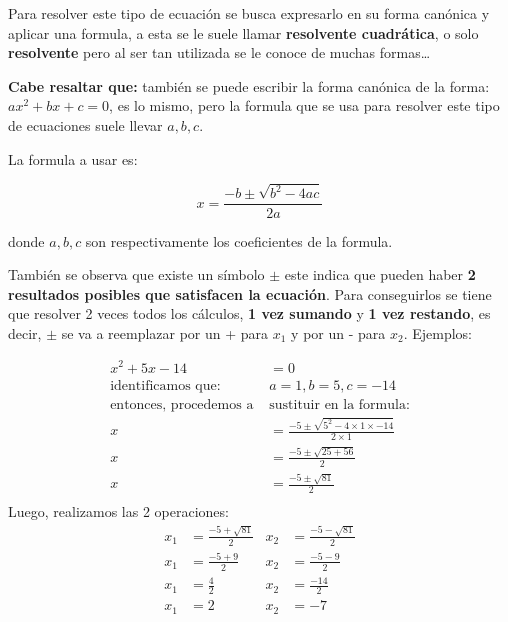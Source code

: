     Para resolver este tipo de ecuación se busca expresarlo en su forma canónica
    y aplicar una formula, a esta se le suele llamar \textbf{resolvente cuadrática},
    o solo \textbf{resolvente} pero al ser tan utilizada se le conoce de muchas
    formas\dots

    \textbf{Cabe resaltar que:}
    también se puede escribir la forma canónica de la forma:
    $ax^2+bx+c=0$, es lo mismo, pero la formula que se usa para resolver este tipo
    de ecuaciones suele llevar $a,b,c$.

    La formula a usar es:

    $$x = \frac{-b \pm \sqrt{b^2 - 4ac}}{2a} $$


    donde $a,b,c$ son respectivamente los coeficientes de la formula.

    También se observa que existe un símbolo $\pm$ este indica que pueden haber
    \textbf{2 resultados posibles que satisfacen la ecuación}. Para conseguirlos
    se tiene que resolver 2 veces todos los cálculos, \textbf{1 vez sumando} y
    \textbf{1 vez restando}, es decir, $\pm$ se va a reemplazar por un + para
    $x_1$ y por un - para $x_2$.    Ejemplos:



    \begin{align*}
        x^2 + 5x -14 &= 0		\\
        \text{identificamos que: }& a=1,b=5,c=-14\\
        \text{entonces, procedemos a }&\text{sustituir en la formula:}\\
        x &= \frac{-5\pm \sqrt{5^2-4\times1\times-14}}{2\times1}\\
        x &= \frac{-5\pm \sqrt{25+56}}{2}\\
        x &= \frac{-5\pm \sqrt{81}}{2}\\
    \end{align*}
        Luego, realizamos las 2 operaciones:
     \begin{align*}
         x_1 &= \frac{-5 +\sqrt{81}}{2} &  x_2 &= \frac{-5 -\sqrt{81}}{2}\\
         x_1 &= \frac{-5 +9}{2} & x_2 &= \frac{-5 -9}{2}\\
         x_1 &= \frac{4}{2} &  x_2 &= \frac{-14}{2}\\
         x_1 &= 2 &  x_2 &= -7
    \end{align*}


